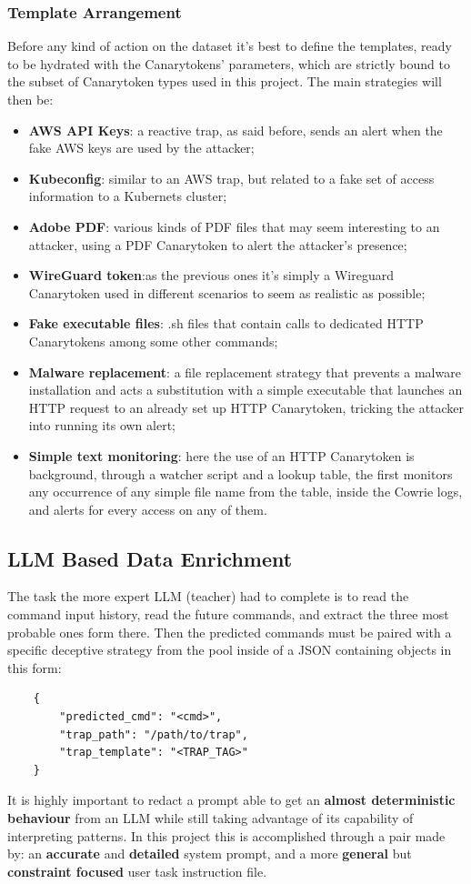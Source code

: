 \documentclass[10pt,a4paper,twocolumn]{article}
\begin{document}
\subsubsection{Template Arrangement}
Before any kind of action on the dataset it's best to define the templates, ready to be hydrated with the Canarytokens' parameters, which are strictly bound to the subset of Canarytoken types used in this project. The main strategies will then be:
\begin{itemize}
    \item \textbf{AWS API Keys}: a reactive trap, as said before, sends an alert when the fake AWS keys are used by the attacker;
    \item \textbf{Kubeconfig}: similar to an AWS trap, but related to a fake set of access information to a Kubernets cluster;
    \item \textbf{Adobe PDF}: various kinds of PDF files that may seem  interesting to an attacker, using a PDF Canarytoken to alert the attacker's presence; 
    \item \textbf{WireGuard token}:as the previous ones it's simply a Wireguard Canarytoken used in different scenarios to seem as realistic as possible;
    \item \textbf{Fake executable files}: .sh files that contain calls to dedicated HTTP Canarytokens among some other commands;
    \item \textbf{Malware replacement}: a file replacement strategy that prevents a malware installation and acts a substitution with a simple executable that launches an HTTP request to an already set up HTTP Canarytoken, tricking the attacker into running its own alert;
    \item \textbf{Simple text monitoring}: here the use of an HTTP Canarytoken is background, through a watcher script and a lookup table, the first monitors any occurrence of any simple file name from the table, inside the Cowrie logs, and alerts for every access on any of them. 
\end{itemize}
\subsection{LLM Based Data Enrichment}
The task the more expert LLM (teacher) had to complete is to read the command input history, read the future commands, and extract the three most probable ones form there. Then the predicted commands must be paired with a specific deceptive strategy from the pool inside of a JSON containing objects in this form:\\
\begin{verbatim}
    {
        "predicted_cmd": "<cmd>",
        "trap_path": "/path/to/trap",
        "trap_template": "<TRAP_TAG>"
    }
\end{verbatim}
It is highly important to redact a prompt able to get an \textbf{almost deterministic behaviour }from an LLM while still taking advantage of its capability of interpreting patterns.
In this project this is accomplished through a pair made by: an \textbf{accurate} and \textbf{detailed} system prompt, and a more \textbf{general} but \textbf{constraint focused} user task instruction file.\\
\end{document}
